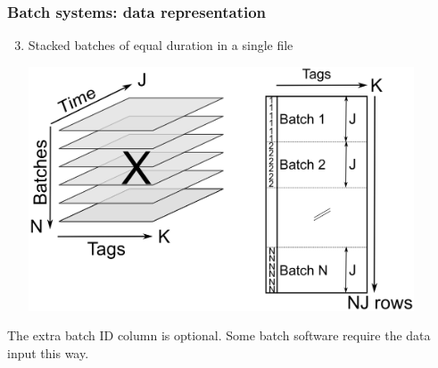 \begin{frame}\frametitle{Batch systems: data representation}

\begin{enumerate}
	\setcounter{enumi}{2}
	\item	Stacked batches of equal duration in a single file

			\begin{center}
				\includegraphics[width=0.9\textwidth]{images/batch-data-layers-into-page-and-unfolded-aligned}
			\end{center}
					
\end{enumerate}
The extra batch ID column is optional.  Some batch software require the data input this way.
\end{frame}

